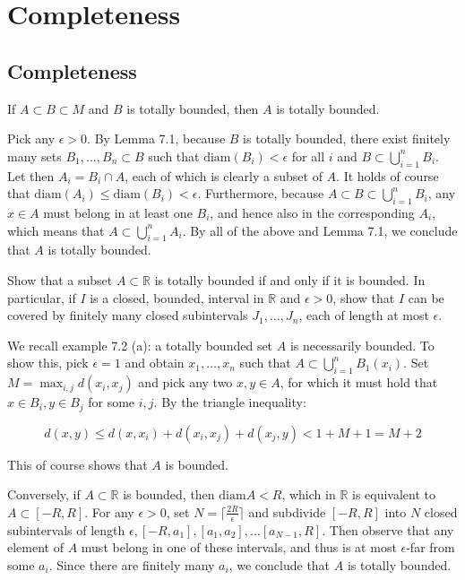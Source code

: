 \chapter{Completeness}

\section{Completeness}

\begin{exercise}{1}
    If $A \subset B \subset M$ and \(B\) is totally bounded, then \(A\) is totally bounded.
\end{exercise}

\begin{solution}
    
    Pick any $\epsilon > 0$.
    By Lemma 7.1, because $B$ is totally bounded, there exist finitely many sets $B_1, \ldots, B_n \subset B$ such that $\text{diam}(B_i) < \epsilon$ for all $i$ and $B \subset \bigcup_{i=1}^{n} B_i$.
    Let then $A_i = B_i \cap A$, each of which is clearly a subset of $A$.
    It holds of course that $\text{diam}(A_i) \leq \text{diam}(B_i) < \epsilon$.
    Furthermore, because $A \subset B \subset \bigcup_{i=1}^{n} B_i$, any $x \in A$ must belong in at least one $B_i$, and hence also in the corresponding $A_i$, which means that $A \subset \bigcup_{i=1}^{n} A_i$.
    By all of the above and Lemma 7.1, we conclude that $A$ is totally bounded.
\end{solution}

\begin{exercise}{2}
    Show that a subset $A \subset \mathbb{R}$ is totally bounded if and only if it is bounded.
    In particular, if $I$ is a closed, bounded, interval in $\mathbb{R}$ and $\epsilon > 0$, show that $I$ can be covered by finitely many closed subintervals $J_1, \ldots, J_n$, each of length at most $\epsilon$.
\end{exercise}

\begin{solution}

    We recall example 7.2 (a): a totally bounded set $A$ is necessarily bounded.
    To show this, pick $\epsilon = 1$ and obtain $x_1, \ldots, x_n$ such that $A \subset \bigcup_{i=1}^{n} B_1(x_i)$.
    Set $M = \max_{i, j} d(x_i, x_j)$ and pick any two $x, y \in A$, for which it must hold that $x \in B_i, y \in B_j$ for some $i, j$.
    By the triangle inequality:

    \[d(x, y) \leq d(x, x_i) + d(x_i, x_j) + d(x_j, y) < 1 + M + 1 = M + 2\]

    This of course shows that $A$ is bounded.
    
    Conversely, if $A \subset \mathbb{R}$ is bounded, then $\text{diam} A < R$, which in $\mathbb{R}$ is equivalent to $A \subset [-R, R]$.
    For any $\epsilon > 0$, set $N = \lceil \frac{2R}{\epsilon} \rceil$ and subdivide $[-R, R]$ into $N$ closed subintervals of length $\epsilon, [-R, a_1], [a_1, a_2], \ldots [a_{N-1}, R]$.
    Then observe that any element of $A$ must belong in one of these intervals, and thus is at most $\epsilon$-far from some $a_i$.
    Since there are finitely many $a_i$, we conclude that $A$ is totally bounded.
\end{solution}